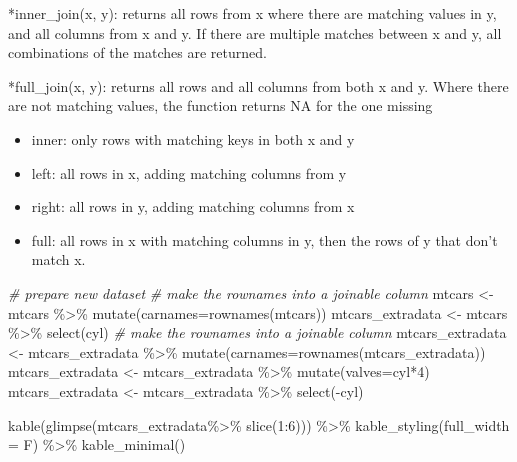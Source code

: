 \documentclass[
]{book}
\newenvironment{Shaded}{\begin{snugshade}}{\end{snugshade}}
\newcommand{\AttributeTok}[1]{\textcolor[rgb]{0.77,0.63,0.00}{#1}}
\newcommand{\CommentTok}[1]{\textcolor[rgb]{0.56,0.35,0.01}{\textit{#1}}}
\newcommand{\DecValTok}[1]{\textcolor[rgb]{0.00,0.00,0.81}{#1}}
\newcommand{\FunctionTok}[1]{\textcolor[rgb]{0.00,0.00,0.00}{#1}}
\newcommand{\NormalTok}[1]{#1}
\newcommand{\OtherTok}[1]{\textcolor[rgb]{0.56,0.35,0.01}{#1}}
\newcommand{\SpecialCharTok}[1]{\textcolor[rgb]{0.00,0.00,0.00}{#1}}
\providecommand{\tightlist}{%
  \setlength{\itemsep}{0pt}\setlength{\parskip}{0pt}}
\begin{document}
*inner\_join(x, y): returns all rows from x where there are matching values in y, and all columns from x and y. If there are multiple matches between x and y, all combinations of the matches are returned.

*full\_join(x, y): returns all rows and all columns from both x and y. Where there are not matching values, the function returns NA for the one missing

\begin{itemize}
\tightlist
\item
  inner: only rows with matching keys in both x and y
\item
  left: all rows in x, adding matching columns from y
\item
  right: all rows in y, adding matching columns from x
\item
  full: all rows in x with matching columns in y, then the rows of y that don't match x.
\end{itemize}

\begin{Shaded}
\begin{Highlighting}[]
\CommentTok{\# prepare new dataset}
\CommentTok{\# make the rownames into a \textquotesingle{}joinable\textquotesingle{} column}
\NormalTok{mtcars }\OtherTok{\textless{}{-}}\NormalTok{ mtcars }\SpecialCharTok{\%\textgreater{}\%} \FunctionTok{mutate}\NormalTok{(}\AttributeTok{carnames=}\FunctionTok{rownames}\NormalTok{(mtcars)) }
\NormalTok{mtcars\_extradata }\OtherTok{\textless{}{-}}\NormalTok{ mtcars }\SpecialCharTok{\%\textgreater{}\%} \FunctionTok{select}\NormalTok{(cyl)}
\CommentTok{\# make the rownames into a \textquotesingle{}joinable\textquotesingle{} column}
\NormalTok{mtcars\_extradata }\OtherTok{\textless{}{-}}\NormalTok{ mtcars\_extradata }\SpecialCharTok{\%\textgreater{}\%}
\FunctionTok{mutate}\NormalTok{(}\AttributeTok{carnames=}\FunctionTok{rownames}\NormalTok{(mtcars\_extradata)) }
\NormalTok{mtcars\_extradata }\OtherTok{\textless{}{-}}\NormalTok{ mtcars\_extradata }\SpecialCharTok{\%\textgreater{}\%} \FunctionTok{mutate}\NormalTok{(}\AttributeTok{valves=}\NormalTok{cyl}\SpecialCharTok{*}\DecValTok{4}\NormalTok{)}
\NormalTok{mtcars\_extradata }\OtherTok{\textless{}{-}}\NormalTok{ mtcars\_extradata }\SpecialCharTok{\%\textgreater{}\%} \FunctionTok{select}\NormalTok{(}\SpecialCharTok{{-}}\NormalTok{cyl)}

\FunctionTok{kable}\NormalTok{(}\FunctionTok{glimpse}\NormalTok{(mtcars\_extradata}\SpecialCharTok{\%\textgreater{}\%} \FunctionTok{slice}\NormalTok{(}\DecValTok{1}\SpecialCharTok{:}\DecValTok{6}\NormalTok{))) }\SpecialCharTok{\%\textgreater{}\%}  
  \FunctionTok{kable\_styling}\NormalTok{(}\AttributeTok{full\_width =}\NormalTok{ F) }\SpecialCharTok{\%\textgreater{}\%}
  \FunctionTok{kable\_minimal}\NormalTok{()}
\end{Highlighting}
\end{Shaded}
\end{document}
